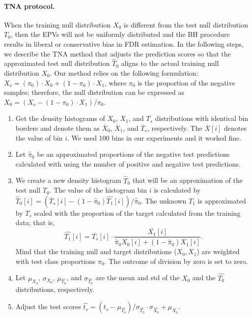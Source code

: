 \documentclass{article}
\begin{document}
\paragraph{TNA protocol.} When the training null distribution $X_0$ is different from the test null distribution $T_0$, then the EPVs will not be uniformly distributed and the BH procedure results in liberal or conservative bias in FDR estimation. In the following steps, we describe the TNA method that adjusts the prediction scores so that the approximated test null distribution $\hat{T}_0$ aligns to the actual training null distribution $X_0$. Our method relies on the following formulation: $X_s = (\pi_0) \cdot X_0 + (1-\pi_0) \cdot X_1$, where $\pi_0$ is the proportion of the negative samples; therefore, the null distribution can be expressed as $X_0 = (X_s - (1-\pi_0) \cdot X_1)/\pi_0$.

\begin{enumerate}%
	\itemsep-3pt  		
	\item Get the density histograms of $X_0$, $X_1$, and $T_s$ distributions with identical bin borders and denote them as $\overline{X}_0$, $\overline{X}_1$, and $\overline{T}_s$, respectively. The $\overline{X}[i]$ denotes the value of bin $i$.  We used 100 bins in our experiments and it worked fine.
	
	\item Let $\hat{\pi}_0$ be an approximated proportions of the negative test predictions calculated with using the number of positive and negative test predictions. 
	
	\item We create a new density histogram $\hat{T}_0$ that will be an approximation of the test null $T_0$. The value of the histogram bin $i$ is calculated  by $\hat{T}_0[i] = (\overline{T}_s[i] -  (1-\hat{\pi}_0)\hat{T_1}[i])/\hat{\pi}_0$. The unknown $T_1$ is approximated by $T_s$ scaled with the proportion of the target calculated from the training data; that is, 
	$$\hat{T_1}[i] = \overline{T_s}[i]\cdot \frac {\overline{X_1}[i]}{\hat{\pi}_0 \overline{X_0}[i] + (1-\hat{\pi}_0) \overline{X_1}[i]}.$$ 
	Mind that the training null and target distributions ($X_0,X_1$) are weighted with test class proportions  $\hat{\pi}_0$. The outcome of division by zero is set to zero.
		
	\item Let $\mu_{X_0}$, $\sigma_{X_0}$, $\mu_{\hat{T_0}}$, and $\sigma_{\hat{T_0}}$ are the mean and std of the $X_0$ and the $\hat{T_0}$ distributions, respectively. 
	
	\item Adjust the test scores $\hat{t_s} = (t_s-\mu_{\hat{T_0}})/\sigma_{\hat{T_0}} \cdot \sigma_{\hat{X_0}} + \mu_{X_0}$.
\end{enumerate}
\end{document}
